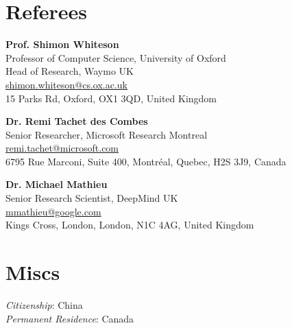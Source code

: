 \documentclass[margin, 10pt]{res} %
\begin{document}
\begin{resume}
\ifdefined{}
\section{Referees}

\textbf{Prof. Shimon Whiteson} \\
Professor of Computer Science, University of Oxford \\
Head of Research, Waymo UK \\
\href{mailto:shimon.whiteson@cs.ox.ac.uk}{shimon.whiteson@cs.ox.ac.uk} \\
15 Parks Rd, Oxford, OX1 3QD, United Kingdom

\textbf{Dr. Remi Tachet des Combes} \\
Senior Researcher, Microsoft Research Montreal \\
\href{mailto:remi.tachet@microsoft.com}{remi.tachet@microsoft.com} \\
6795 Rue Marconi, Suite 400, Montréal, Quebec, H2S 3J9, Canada

\textbf{Dr. Michael Mathieu} \\
Senior Research Scientist, DeepMind UK \\
\href{mailto:mmathieu@google.com}{mmathieu@google.com} \\
Kings Cross, London, London, N1C 4AG, United Kingdom
\fi

\ifdefined\misc
\section{Miscs}
{\sl Citizenship}: China \\
{\sl Permanent Residence}: Canada \\
\fi
\end{resume}
\end{document}
